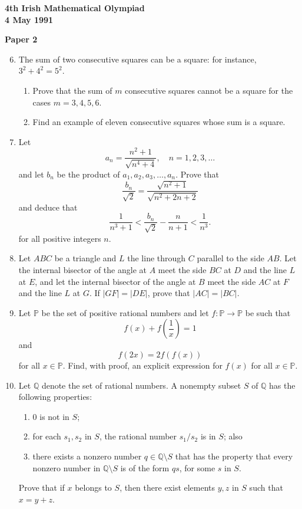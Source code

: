 \documentclass[12pt]{article}
\begin{document}
\newpage

\begin{center}
{\large\bfseries 4th Irish Mathematical Olympiad\\
4 May 1991}
\end{center}

\bigskip
\noindent\textbf{Paper 2}
\bigskip

\begin{enumerate}
\setcounter{enumi}{5}
\item The sum of two consecutive squares can be a square: for instance, $3^2 + 4^2 = 5^2$. \begin{enumerate} \item[(a)] Prove that the sum of $m$ consecutive squares cannot be a square for the cases $m = 3, 4, 5, 6$. \item[(b)] Find an example of eleven consecutive squares whose sum is a square. \end{enumerate}

\item Let \[a_n = \frac{n^2+1}{\sqrt{n^4+4}}, \quad n = 1,2,3,\ldots\] and let $b_n$ be the product of $a_1, a_2, a_3, \ldots, a_n$. Prove that \[\frac{b_n}{\sqrt{2}} = \frac{\sqrt{n^2+1}}{\sqrt{n^2+2n+2}}\] and deduce that \[\frac{1}{n^3+1} < \frac{b_n}{\sqrt{2}} - \frac{n}{n+1} < \frac{1}{n^3}.\] for all positive integers $n$.

\item Let $ABC$ be a triangle and $L$ the line through $C$ parallel to the side $AB$. Let the internal bisector of the angle at $A$ meet the side $BC$ at $D$ and the line $L$ at $E$, and let the internal bisector of the angle at $B$ meet the side $AC$ at $F$ and the line $L$ at $G$. If $|GF| = |DE|$, prove that $|AC| = |BC|$.

\item Let $\mathbb{P}$ be the set of positive rational numbers and let $f : \mathbb{P} \to \mathbb{P}$ be such that \[f(x) + f\left(\frac{1}{x}\right) = 1\] and \[f(2x) = 2f(f(x))\] for all $x \in \mathbb{P}$. Find, with proof, an explicit expression for $f(x)$ for all $x \in \mathbb{P}$.

\item Let $\mathbb{Q}$ denote the set of rational numbers. A nonempty subset $S$ of $\mathbb{Q}$ has the following properties: \begin{enumerate} \item[(a)] 0 is not in $S$; \item[(b)] for each $s_1, s_2$ in $S$, the rational number $s_1/s_2$ is in $S$; also \item[(c)] there exists a nonzero number $q \in \mathbb{Q}\setminus S$ that has the property that every nonzero number in $\mathbb{Q}\setminus S$ is of the form $qs$, for some $s$ in $S$. \end{enumerate} Prove that if $x$ belongs to $S$, then there exist elements $y, z$ in $S$ such that $x = y + z$.

\end{enumerate}
\end{document}
